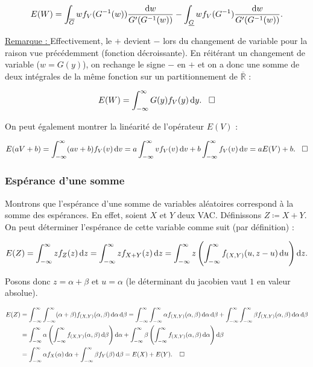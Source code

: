 \documentclass{article}
\begin{document}
		\[E(W) = \int_{\overline G}wf_V(G^{-1}(w))\frac {\dif w}{G'(G^{-1}(w))} - \int_{\underline G}wf_V(G^{-1})\frac {\dif w}{G'(G^{-1}(w))}.\]

		\underline {Remarque : } Effectivement, le $+$ devient $-$ lors du changement de variable pour la raison vue précédemment (fonction décroissante).
		En réitérant un changement de variable ($w = G(y)$), on rechange le signe $-$ en $+$ et on a donc une somme de deux intégrales de la même fonction sur un partitionnement
		de $\overline {\mathbb R}$ :

		\[E(W) = \int_{-\infty}^\infty G(y)f_V(y)\dif y. \;\;\;\square\]

		On peut également montrer la linéarité de l'opérateur $E(V)$ :

		\[E(aV + b) = \int_{-\infty}^\infty(av+b)f_V(v)\dif v = a\int_{-\infty}^\infty vf_V(v)\dif v + b\int_{-\infty}^\infty f_V(v)\dif v = aE(V) + b. \;\;\;\square\]

		\subsubsection{Espérance d'une somme}
			Montrons que l'espérance d'une somme de variables aléatoires correspond à la somme des espérances.
			En effet, soient $X$ et $Y$ deux VAC. Définissons $Z \coloneqq X+Y$. On peut déterminer l'espérance de cette variable comme suit (par définition) :

			\[E(Z) = \int_{-\infty}^\infty zf_Z(z)\dif z = \int_{-\infty}^\infty zf_{X+Y}(z)\dif z =
				\int_{-\infty}^\infty z\left(\int_{-\infty}^\infty f_{(X, Y)}(u, z-u)\dif u\right)\dif z.\]

			Posons donc $z = \alpha + \beta$ et $u = \alpha$ (le déterminant du jacobien vaut $1$ en valeur absolue).

			\[\begin{aligned}
				E(Z) &= \int_{-\infty}^\infty\int_{-\infty}^\infty(\alpha + \beta)f_{(X, Y)}(\alpha, \beta) \dif \alpha \dif \beta =
				\int_{-\infty}^\infty\int_{-\infty}^\infty\alpha f_{(X, Y)}(\alpha, \beta)\dif\alpha\dif\beta + \int_{-\infty}^\infty\int_{-\infty}^\infty\beta f_{(X, Y)}(\alpha, \beta)\dif\alpha\dif\beta \\
					 &= \int_{-\infty}^\infty\alpha\left(\int_{-\infty}^\infty f_{(X, Y)}(\alpha, \beta)\dif\beta\right)\dif\alpha + \int_{-\infty}^\infty\beta\left(\int_{-\infty}^\infty f_{(X, Y)}(\alpha, \beta)\dif\alpha\right)\dif\beta \\
					 &= \int_{-\infty}^\infty\alpha f_X(\alpha)\dif\alpha + \int_{-\infty}^\infty\beta f_Y(\beta)\dif\beta = E(X) + E(Y).\;\;\;\;\square
			\end{aligned}\]
\end{document}

